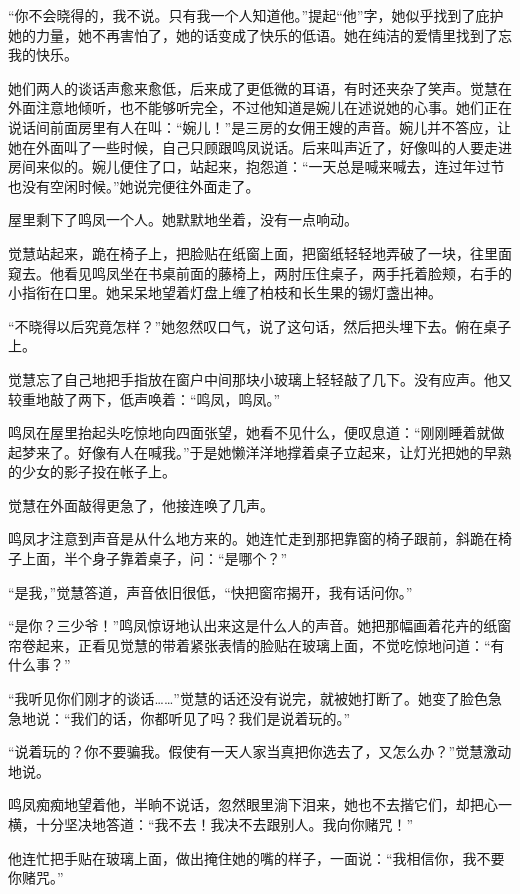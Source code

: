 \par “你不会晓得的，我不说。只有我一个人知道他。”提起“他”字，她似乎找到了庇护她的力量，她不再害怕了，她的话变成了快乐的低语。她在纯洁的爱情里找到了忘我的快乐。
\par 她们两人的谈话声愈来愈低，后来成了更低微的耳语，有时还夹杂了笑声。觉慧在外面注意地倾听，也不能够听完全，不过他知道是婉儿在述说她的心事。她们正在说话间前面房里有人在叫：“婉儿！”是三房的女佣王嫂的声音。婉儿并不答应，让她在外面叫了一些时候，自己只顾跟鸣凤说话。后来叫声近了，好像叫的人要走进房间来似的。婉儿便住了口，站起来，抱怨道：“一天总是喊来喊去，连过年过节也没有空闲时候。”她说完便往外面走了。
\par 屋里剩下了鸣凤一个人。她默默地坐着，没有一点响动。
\par 觉慧站起来，跪在椅子上，把脸贴在纸窗上面，把窗纸轻轻地弄破了一块，往里面窥去。他看见鸣凤坐在书桌前面的藤椅上，两肘压住桌子，两手托着脸颊，右手的小指衔在口里。她呆呆地望着灯盘上缠了柏枝和长生果的锡灯盏出神。
\par “不晓得以后究竟怎样？”她忽然叹口气，说了这句话，然后把头埋下去。俯在桌子上。
\par 觉慧忘了自己地把手指放在窗户中间那块小玻璃上轻轻敲了几下。没有应声。他又较重地敲了两下，低声唤着：“鸣凤，鸣凤。”
\par 鸣凤在屋里抬起头吃惊地向四面张望，她看不见什么，便叹息道：“刚刚睡着就做起梦来了。好像有人在喊我。”于是她懒洋洋地撑着桌子立起来，让灯光把她的早熟的少女的影子投在帐子上。
\par 觉慧在外面敲得更急了，他接连唤了几声。
\par 鸣凤才注意到声音是从什么地方来的。她连忙走到那把靠窗的椅子跟前，斜跪在椅子上面，半个身子靠着桌子，问：“是哪个？”
\par “是我，”觉慧答道，声音依旧很低，“快把窗帘揭开，我有话问你。”
\par “是你？三少爷！”鸣凤惊讶地认出来这是什么人的声音。她把那幅画着花卉的纸窗帘卷起来，正看见觉慧的带着紧张表情的脸贴在玻璃上面，不觉吃惊地问道：“有什么事？”
\par “我听见你们刚才的谈话……”觉慧的话还没有说完，就被她打断了。她变了脸色急急地说：“我们的话，你都听见了吗？我们是说着玩的。”
\par “说着玩的？你不要骗我。假使有一天人家当真把你选去了，又怎么办？”觉慧激动地说。
\par 鸣凤痴痴地望着他，半晌不说话，忽然眼里淌下泪来，她也不去揩它们，却把心一横，十分坚决地答道：“我不去！我决不去跟别人。我向你赌咒！”
\par 他连忙把手贴在玻璃上面，做出掩住她的嘴的样子，一面说：“我相信你，我不要你赌咒。”
